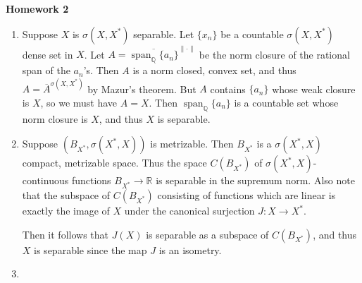 \documentclass[11pt, reqno]{article}
\theoremstyle{plain}
\theoremstyle{definition}
\theoremstyle{remark}
\newcommand{\RR}{\mathbb{R}}
\newcommand{\QQ}{\mathbb{Q}}
\begin{document}
\topmargin=-40pt
\renewcommand{\headrulewidth}{1pt}
\renewcommand{\headsep}{20pt}
\thispagestyle{fancy}

{\Huge \bfseries \noindent Homework 2}

\begin{enumerate}
    \item[1.] Suppose $X$ is $\sigma(X, X^*)$ separable. Let $\{x_n\}$ be a countable 
    $\sigma(X, X^*)$ dense set in $X$. Let $A = \overline{\operatorname{span}_\QQ\{a_n\}}^{\|\cdot\|}$ 
    be the norm closure of the rational
    span of the $a_n$'s. Then $A$ is a norm closed, convex set, and thus $A = \overline{A}^{\sigma(X ,X^*)}$
    by Mazur's theorem. But $A$ contains $\{a_n\}$ whose weak closure is $X$, so we must have 
    $A = X$. Then $\operatorname{span}_\QQ\{a_n\}$ is a countable set whose norm closure 
    is $X$, and thus $X$ is separable. 

    \item[2.] Suppose $(B_{X^*}, \sigma(X^*, X))$ is metrizable. Then $B_{X^*}$ is a $\sigma(X^*, X)$
    compact, metrizable space. Thus the space $C(B_{X^*})$ of $\sigma(X^{*}, X)$-continuous functions $B_{X^*} \rightarrow \RR$
    is separable in the supremum norm. Also note that the subspace of $C(B_{X^*})$ consisting 
    of functions which are linear is exactly the image of $X$ under the canonical 
    surjection $J: X \rightarrow X^*$.

    Then it follows that $J(X)$ is separable as a subspace of $C(B_{X^*})$, and thus 
    $X$ is separable since the map $J$ is an isometry. 

    \item[3.] 

\end{enumerate}
\end{document}
